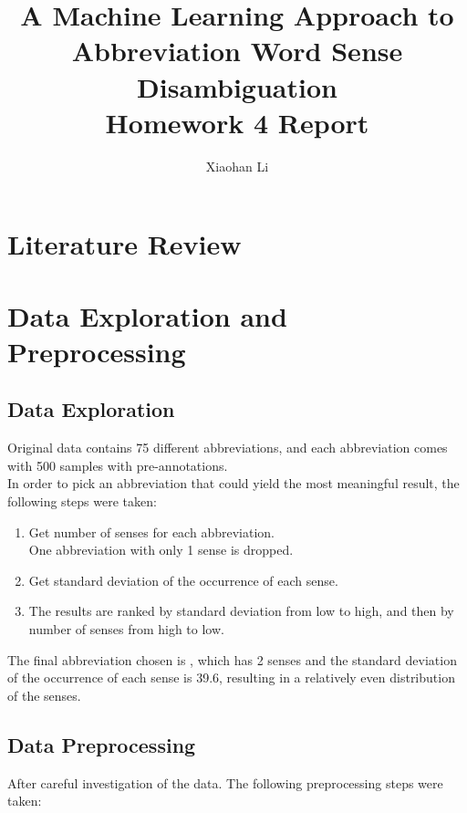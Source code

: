\documentclass{article}
\author{Xiaohan Li}
\title{\huge{A Machine Learning Approach to Abbreviation Word Sense Disambiguation}\\
\LARGE{Homework 4 Report}}
\begin{document}
    \begin{titlepage}
        \maketitle    
    \end{titlepage}
    \tableofcontents
    \section{Literature Review}
    \section{Data Exploration and Preprocessing}
    \subsection{Data Exploration}
    Original data contains 75 different abbreviations, and each abbreviation comes with 500 samples with pre-annotations.\\
    In order to pick an abbreviation that could yield the most meaningful result, the following steps were taken:
    \begin{enumerate}
        \item Get number of senses for each abbreviation.\\
              One abbreviation with only 1 sense is dropped.
        \item Get standard deviation of the occurrence of each sense.
        \item The results are ranked by standard deviation from low to high, and then by number of senses from high to low.
    \end{enumerate}
    The final abbreviation chosen is , which has 2 senses and the standard deviation of the occurrence of each sense is 39.6, resulting in a relatively even distribution of the senses.
    \subsection{Data Preprocessing}
    After careful investigation of the data. The following preprocessing steps were taken:
\end{document}
